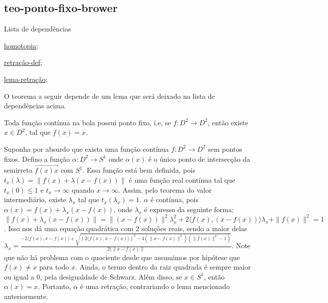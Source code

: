 \subsection{teo-ponto-fixo-brower} %
\label{teo-ponto-fixo-brower}
\begin{titlemize}{Lista de dependências}
	\item \hyperref[homotopia]{homotopia};\\ %
	\item \hyperref[retração-def]{retração-def};\\
    \item \hyperref[lema-retração]{lema-retração};\\
\end{titlemize}
O teorema a seguir depende de um lema que será deixado na lista de dependências acima.
\begin{thm}[Teorema do Ponto Fixo de Brower]%
	Toda função contínua na bola possui ponto fixo, i.e, se $f:D^2 \longrightarrow D^2$, então existe $x \in D^2$, tal que $f(x) = x$.
\end{thm}

\begin{dem}
    Suponha por absurdo que exista uma função contínua $f:D^2 \longrightarrow D^2$ sem pontos fixos. Defino a função $\alpha: D^2 \longrightarrow S^1$ onde $\alpha(x)$ é o único ponto de intersecção da semirreta $\overrightarrow{f(x)x}$ com $S^1$. Essa função está bem definida, pois $t_x(\lambda) = \|f(x) + \lambda(x - f(x))\|$ é uma função real contínua tal que $t_x(0) \leq 1$ e $t_x \to \infty$ quando $x \to \infty$. Assim, pelo teorema do valor intermediário, existe $\lambda_x$ tal que $t_x(\lambda_x) = 1$. $\alpha$ é contínua, pois $\alpha(x) = f(x) + \lambda_x(x - f(x))$, onde $\lambda_x$ é expresso da seguinte forma:
    $\|f(x) + \lambda_x(x - f(x))\| = \|(x - f(x))\|^2\lambda_x^2 + 2\langle f(x), (x - f(x)) \rangle\lambda_x + \|f(x)\|^2 = 1$. Isso nos dá uma equação quadrática com 2 soluções reais, sendo a maior delas $\lambda_x = \frac{-2\langle f(x), x - f(x)\rangle + \sqrt{(2\langle f(x), x - f(x)\rangle)^2 - 4(\|x - f(x)\|^2)(\|f(x)\|^2 - 1)}}{2(\|x - f(x)\|}$. Note que não há problema com o quociente desde que assumimos por hipótese que $f(x) \ne x$ para todo $x$. Ainda, o termo dentro da raiz quadrada é sempre maior ou igual a 0, pela desigualdade de Schwarz. Além disso, se $x \in S^1$, então $\alpha(x) = x$. Portanto, $\alpha$ é uma retração, contrariando o lema mencionado anteriormente.
    
\end{dem}

